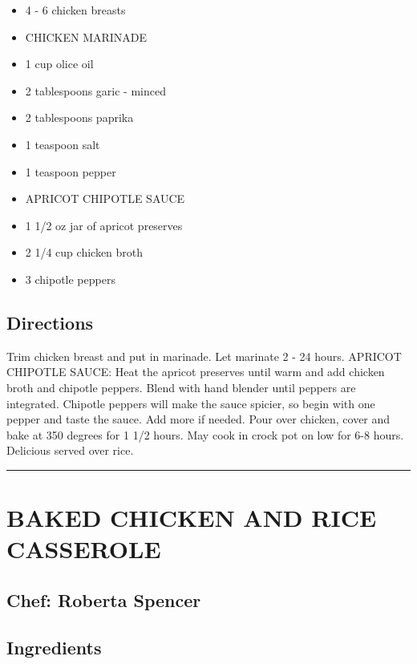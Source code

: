 \documentclass[
]{book}
\providecommand{\tightlist}{%
  \setlength{\itemsep}{0pt}\setlength{\parskip}{0pt}}
\begin{document}
\begin{itemize}
\tightlist
\item
  4 - 6 chicken breasts
\item
  CHICKEN MARINADE
\item
  1 cup olice oil
\item
  2 tablespoons garic - minced
\item
  2 tablespoons paprika
\item
  1 teaspoon salt
\item
  1 teaspoon pepper
\item
  APRICOT CHIPOTLE SAUCE
\item
  1 1/2 oz jar of apricot preserves
\item
  2 1/4 cup chicken broth
\item
  3 chipotle peppers
\end{itemize}

\hypertarget{directions-40}{%
\subsection*{Directions}\label{directions-40}}


Trim chicken breast and put in marinade. Let marinate 2 - 24 hours.
APRICOT CHIPOTLE SAUCE: Heat the apricot preserves until warm and
add chicken broth and chipotle peppers. Blend with hand blender until peppers
are integrated. Chipotle peppers will make the sauce spicier, so
begin with one pepper and taste the sauce. Add more if needed.
Pour over chicken, cover and bake at 350 degrees for 1 1/2 hours.
May cook in crock pot on low for 6-8 hours. Delicious served over rice.

\begin{center}\rule{0.5\linewidth}{0.5pt}\end{center}

\hypertarget{baked-chicken-and-rice-casserole}{%
\section*{BAKED CHICKEN AND RICE CASSEROLE}\label{baked-chicken-and-rice-casserole}}


\hypertarget{chef-roberta-spencer-14}{%
\subsection*{Chef: Roberta Spencer}\label{chef-roberta-spencer-14}}


\hypertarget{ingredients-41}{%
\subsection*{Ingredients}\label{ingredients-41}}
\end{document}
